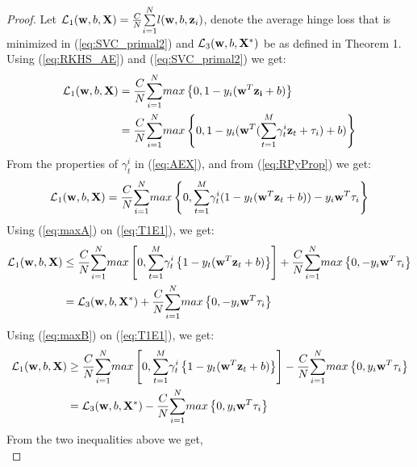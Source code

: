 \documentclass[twoside]{article}
\begin{document}
\begin{proof}
Let ${\cal L}_1({\bf w},b,{\bf X}) = \frac{C}{N}\overset{N}{\underset{i = 1}\sum}l(\mathbf{w},b,{\bf z}_i)$, denote the average hinge loss that is minimized in (\ref{eq:SVC_primal2}) and ${\cal L}_3({\bf w},b,{\bf X}^*)$ be as defined in Theorem 1. Using (\ref{eq:RKHS_AE}) and (\ref{eq:SVC_primal2}) we get:
\begin{align*}
{\cal L}_1({\bf w},b,{\bf X}) &= \frac{C}{N}\overset{N}{\underset{i = 1}\sum} max\left\{0, 1- y_{i}(\mathbf{w}^T \mathbf{z_{i}} + b)\right\}\\
									&= \frac{C}{N}\overset{N}{\underset{i = 1}\sum} max\left\{0, 1- y_{i}(\mathbf{w}^T (\overset{M}{\underset{t = 1}{\sum}} \gamma^i _t{{\bf z}_t} + \tau_i) + b)\right\}
\end{align*}									
From the properties of $\gamma^i _t$ in (\ref{eq:AEX}), and from (\ref{eq:RPyProp}) we get:
\begin{equation}
{\cal L}_1({\bf w},b,{\bf X}) = \frac{C}{N}\overset{N}{\underset{i = 1}\sum} max\left\{0, \overset{M}{\underset{t = 1}{\sum}} \gamma^i _t (1- y_{t}(\mathbf{w}^T {{\bf z}_t} + b)) - y_{i}\mathbf{w}^T \tau_i\right\} \label{eq:T1E1}
\end{equation}
Using (\ref{eq:maxA}) on (\ref{eq:T1E1}), we get:
\begin{align*}
{\cal L}_1({\bf w},b,{\bf X}) &\le \frac{C}{N}\overset{N}{\underset{i = 1}{\sum}}  max\left[0, \overset{M}{\underset{t = 1}\sum} \gamma^i _t\left\{1- y_{t}(\mathbf{w}^T {{\bf z}_t} + b)\right\}\right] + \frac{C}{N}\overset{N}{\underset{i = 1}{\sum}}max\left\{0, -y_{i}\mathbf{w}^T \tau_i\right\}\\
&= {\cal L}_3({\bf w},b,{\bf X}^*) + \frac{C}{N}\overset{N}{\underset{i = 1}{\sum}}max\left\{0, -y_{i}\mathbf{w}^T \tau_i\right\}
\end{align*}
Using (\ref{eq:maxB}) on (\ref{eq:T1E1}), we get:
\begin{align*}
{\cal L}_1({\bf w},b,{\bf X}) &\ge \frac{C}{N}\overset{N}{\underset{i = 1}{\sum}}  max\left[0, \overset{M}{\underset{t = 1}\sum} \gamma^i _t\left\{1- y_{t}(\mathbf{w}^T {{\bf z}_t} + b)\right\}\right] - \frac{C}{N}\overset{N}{\underset{i = 1}{\sum}}max\left\{0, y_{i}\mathbf{w}^T \tau_i\right\}\\
&= {\cal L}_3({\bf w},b,{\bf X}^*) - \frac{C}{N}\overset{N}{\underset{i = 1}{\sum}}max\left\{0, y_{i}\mathbf{w}^T \tau_i\right\}
\end{align*}
From the two inequalities above we get,
\begin{equation*}

\end{equation*}
\end{proof}
\end{document}
